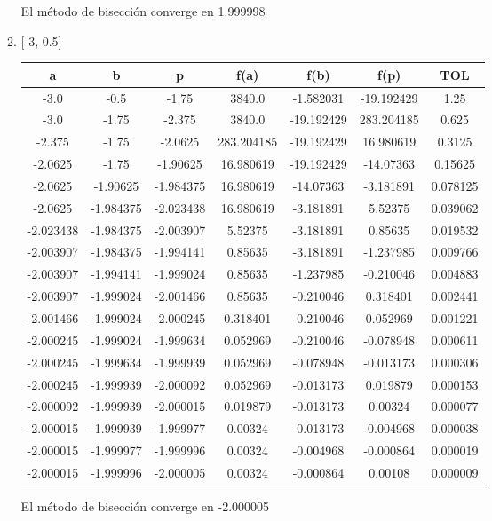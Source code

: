 \documentclass[12pt]{article}
\begin{document}
\begin{enumerate}
\begin{enumerate}[label=\alph*]
        El método de bisección converge en 1.999998
        \item {[-3,-0.5]}\\
        \begin{tabular}{|c|c|c|c|c|c|c|}
            \hline
            \textbf{a} & \textbf{b} & \textbf{p} & \textbf{f(a)} & \textbf{f(b)} & \textbf{f(p)} & \textbf{TOL}\\ \hline
            -3.0 & -0.5 & -1.75 & 3840.0 & -1.582031 & -19.192429 & 1.25 \\
            -3.0 & -1.75 & -2.375 & 3840.0 & -19.192429 & 283.204185 & 0.625 \\
            -2.375 & -1.75 & -2.0625 & 283.204185 & -19.192429 & 16.980619 & 0.3125 \\
            -2.0625 & -1.75 & -1.90625 & 16.980619 & -19.192429 & -14.07363 & 0.15625 \\
            -2.0625 & -1.90625 & -1.984375 & 16.980619 & -14.07363 & -3.181891 & 0.078125 \\
            -2.0625 & -1.984375 & -2.023438 & 16.980619 & -3.181891 & 5.52375 & 0.039062 \\
            -2.023438 & -1.984375 & -2.003907 & 5.52375 & -3.181891 & 0.85635 & 0.019532 \\
            -2.003907 & -1.984375 & -1.994141 & 0.85635 & -3.181891 & -1.237985 & 0.009766 \\
            -2.003907 & -1.994141 & -1.999024 & 0.85635 & -1.237985 & -0.210046 & 0.004883 \\
            -2.003907 & -1.999024 & -2.001466 & 0.85635 & -0.210046 & 0.318401 & 0.002441 \\
            -2.001466 & -1.999024 & -2.000245 & 0.318401 & -0.210046 & 0.052969 & 0.001221 \\
            -2.000245 & -1.999024 & -1.999634 & 0.052969 & -0.210046 & -0.078948 & 0.000611 \\
            -2.000245 & -1.999634 & -1.999939 & 0.052969 & -0.078948 & -0.013173 & 0.000306 \\
            -2.000245 & -1.999939 & -2.000092 & 0.052969 & -0.013173 & 0.019879 & 0.000153 \\
            -2.000092 & -1.999939 & -2.000015 & 0.019879 & -0.013173 & 0.00324 & 0.000077 \\
            -2.000015 & -1.999939 & -1.999977 & 0.00324 & -0.013173 & -0.004968 & 0.000038 \\
            -2.000015 & -1.999977 & -1.999996 & 0.00324 & -0.004968 & -0.000864 & 0.000019 \\
            -2.000015 & -1.999996 & -2.000005 & 0.00324 & -0.000864 & 0.00108 & 0.000009 \\
            \hline
        \end{tabular}

        El método de bisección converge en -2.000005
    \end{enumerate}
    
\end{enumerate}

%
%
\end{document}

